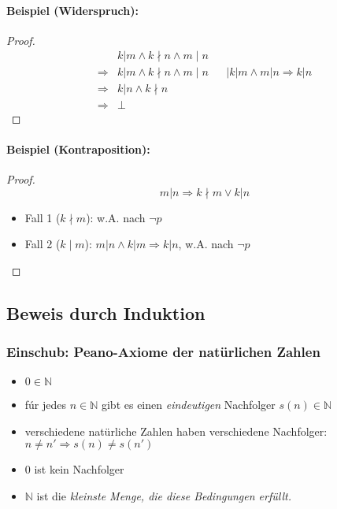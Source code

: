 \paragraph{Beispiel (Widerspruch):}
\begin{proof}
\begin{align*}
&k|m\land k\nmid n \land m\mid n \\
\Rightarrow &k|m\land k\nmid n \land m\mid n && \mid k|m \land m|n \Rightarrow k|n \\
\Rightarrow &k|n \land k\nmid n \\
\Rightarrow &\bot
\end{align*}
\end{proof}

\paragraph{Beispiel (Kontraposition):}
\begin{proof}
\[
m|n \Rightarrow k\nmid m \lor k|n
\]
\begin{itemize}
\item Fall 1 ($k\nmid m$): w.A. nach $\neg p$
\item Fall 2 ($k\mid m$): $m|n \land k|m \Rightarrow k|n$, w.A. nach $\neg p$
\end{itemize}
\end{proof}

\subsection{Beweis durch Induktion}
\subsubsection{Einschub: Peano-Axiome der natürlichen Zahlen}
\begin{itemize}
\item $0\in\mathbb{N}$
\item fúr jedes $n\in\mathbb{N}$ gibt es einen \emph{eindeutigen} Nachfolger $s(n)\in\mathbb{N}$
\item verschiedene natürliche Zahlen haben verschiedene Nachfolger:\\
$n\neq n' \Rightarrow s(n) \neq s(n')$
\item $0$ ist kein Nachfolger
\item $\mathbb{N}$ ist die \emph{kleinste Menge, die diese Bedingungen erfüllt.}
\end{itemize}


